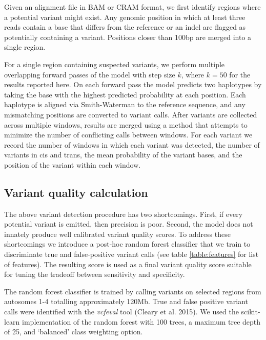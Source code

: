 \documentclass[]{article}
\begin{document}
Given an alignment file in BAM or CRAM format, we first identify regions where a potential variant might exist. Any genomic position in which at least three reads contain a base that differs from the reference or an indel are flagged as potentially containing a variant. Positions closer than 100bp are merged into a single region. 

For a single region containing suspected variants, we perform multiple overlapping forward passes of the model with step size $k$, where $k=50$ for the results reported here. On each forward pass the model predicts two haplotypes by taking the base with the highest predicted probability at each position. Each haplotype is aligned via Smith-Waterman to the reference sequence, and any mismatching positions are converted to variant calls. After variants are collected across multiple windows, results are merged using a method that attempts to minimize the number of conflicting calls between windows. For each variant we record the number of windows in which each variant was detected, the number of variants in cis and trans, the mean probability of the variant bases, and the position of the variant within each window.  


\subsection{Variant quality calculation}

The above variant detection procedure has two shortcomings. First, if every potential variant is emitted, then precision is poor. Second, the model does not innately produce well calibrated variant quality scores. To address these shortcomings we introduce a post-hoc random forest classifier that we train to discriminate true and false-positive variant calls (see table \ref{table:features} for list of features).  The resulting score is used as a final variant quality score suitable for tuning the tradeoff between sensitivity and specificity. 

The random forest classifier is trained by calling variants on selected regions from autosomes 1-4 totalling approximately 120Mb. True and false positive variant calls were identified with the \textit{vcfeval} tool (Cleary et al. 2015). We used the scikit-learn implementation of the random forest with 100 trees, a maximum tree depth of 25, and `balanced' class weighting option.  
\end{document}
